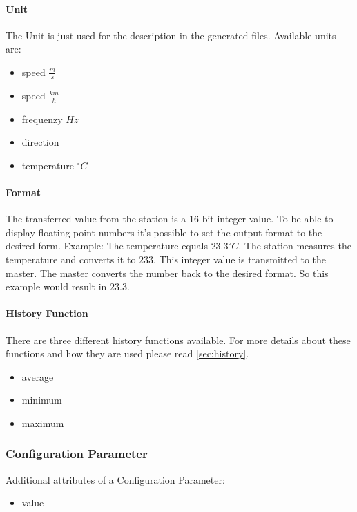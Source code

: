 \paragraph{Unit} %
\label{par:unit}
The Unit is just used for the description in the generated files. Available units are:
\begin{itemize}
	\item speed $\frac{m}{s}$
	\item speed $\frac{km}{h}$
	\item frequenzy $Hz$
	\item direction
	\item temperature $^\circ C$
\end{itemize}


\paragraph{Format} %
\label{par:format}
The transferred value from the station is a 16 bit integer value. To be able to display floating point numbers it's possible to set the output format to the desired form. Example: The temperature equals $23.3 ^\circ C$. The station measures the temperature and converts it to $233$. This integer value is transmitted to the master. The master converts the number back to the desired format. So this example would result in $23.3$.

\paragraph{History Function} %
\label{par:histfunc}
There are three different history functions available. For more details about these functions and how they are used please read \ref{sec:history}.
\label{par:history_function}
\begin{itemize}
    \item average
    \item minimum
    \item maximum
\end{itemize}

\subsubsection{Configuration Parameter} %
\label{ssub:configuration_parameter}
Additional attributes of a Configuration Parameter:
\begin{itemize}
    \item value
\end{itemize}

